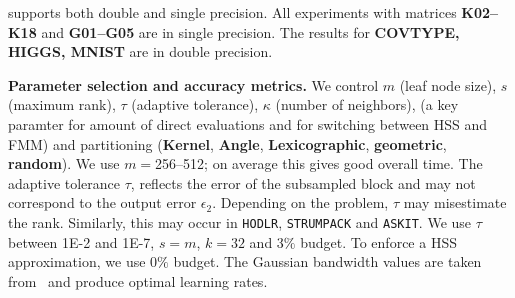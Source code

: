 \gofmm{} supports both double and single precision. All experiments with matrices \textbf{K02--K18} and \textbf{G01--G05} are in single precision. The results for {\bf COVTYPE, HIGGS, MNIST} are in double precision.


\textbf{Parameter selection and accuracy metrics.}
We control $m$ (leaf node size), 
$s$ (maximum rank), $\tau$ (adaptive tolerance), $\kappa$ (number of
neighbors),  (a key paramter for amount of direct evaluations
and for switching between HSS and FMM) and partitioning (\textbf{Kernel},
\textbf{Angle}, \textbf{Lexicographic}, \textbf{geometric}, \textbf{random}).
We use $m=$256--512; on average this gives good overall time.  The adaptive
tolerance $\tau$, reflects the error of the subsampled  block and may not
correspond to the output error $\epsilon_2$. Depending on the problem, $\tau$ may misestimate the rank.
Similarly, this may occur in \texttt{HODLR}, \texttt{STRUMPACK} and \texttt{ASKIT}.
We use $\tau$ between 1E-2 and 1E-7, $s=m$, $k=32$ and $3\%$ budget. To enforce a HSS approximation, we use $0\%$ budget. The Gaussian bandwidth values are taken from~\cite{march-xiao-biros-e15} and produce optimal learning rates.

